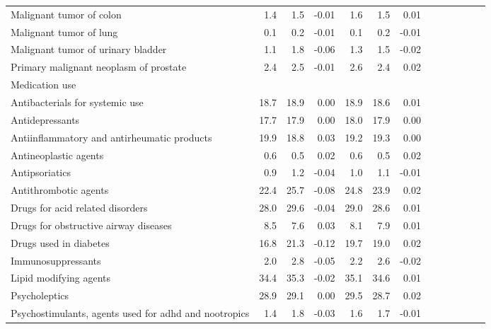 \documentclass[11pt,]{article}
\begin{document}
\begin{longtable}{lrrrrrrrrrrrr}
      Malignant tumor of colon &  1.4 &  1.5 & -0.01 &  1.6 &  1.5 &  0.01 \\ 
      Malignant tumor of lung &  0.1 &  0.2 & -0.01 &  0.1 &  0.2 & -0.01 \\ 
      Malignant tumor of urinary bladder &  1.1 &  1.8 & -0.06 &  1.3 &  1.5 & -0.02 \\ 
      Primary malignant neoplasm of prostate &  2.4 &  2.5 & -0.01 &  2.6 &  2.4 &  0.02 \\ 
  Medication use &    &    &     &    &    &     \\ 
      Antibacterials for systemic use & 18.7 & 18.9 &  0.00 & 18.9 & 18.6 &  0.01 \\ 
      Antidepressants & 17.7 & 17.9 &  0.00 & 18.0 & 17.9 &  0.00 \\ 
      Antiinflammatory and antirheumatic products & 19.9 & 18.8 &  0.03 & 19.2 & 19.3 &  0.00 \\ 
      Antineoplastic agents &  0.6 &  0.5 &  0.02 &  0.6 &  0.5 &  0.02 \\ 
      Antipsoriatics &  0.9 &  1.2 & -0.04 &  1.0 &  1.1 & -0.01 \\ 
      Antithrombotic agents & 22.4 & 25.7 & -0.08 & 24.8 & 23.9 &  0.02 \\ 
      Drugs for acid related disorders & 28.0 & 29.6 & -0.04 & 29.0 & 28.6 &  0.01 \\ 
      Drugs for obstructive airway diseases &  8.5 &  7.6 &  0.03 &  8.1 &  7.9 &  0.01 \\ 
      Drugs used in diabetes & 16.8 & 21.3 & -0.12 & 19.7 & 19.0 &  0.02 \\ 
      Immunosuppressants &  2.0 &  2.8 & -0.05 &  2.2 &  2.6 & -0.02 \\ 
      Lipid modifying agents & 34.4 & 35.3 & -0.02 & 35.1 & 34.6 &  0.01 \\ 
      Psycholeptics & 28.9 & 29.1 &  0.00 & 29.5 & 28.7 &  0.02 \\ 
      Psychostimulants, agents used for adhd and nootropics &  1.4 &  1.8 & -0.03 &  1.6 &  1.7 & -0.01 \\ 
   \bottomrule\end{longtable}
\clearpage
{}
\end{document}
